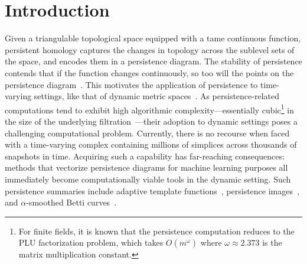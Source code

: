 \documentclass[sn-mathphys]{sn-jnl}
\begin{document}

\section{Introduction} 
Given a triangulable topological space equipped with a tame continuous function, persistent homology captures the changes in topology across the sublevel sets of the space, and encodes them in a persistence diagram. The stability of persistence contends that   if the function changes continuously, so too will the points on the persistence diagram~\cite{cohen2007stability, cohen2006vines}. 
This motivates the  application of persistence to time-varying  settings, like that of dynamic metric spaces~\cite{kim2020spatiotemporal}. 
As persistence-related computations tend to exhibit high algorithmic complexity---essentially cubic\footnote{For finite fields, it is known that the persistence computation reduces to the PLU factorization problem, which takes $O(m^\omega)$ where $\omega \approx 2.373$ is the matrix multiplication constant.} in the size of the underlying filtration~\cite{morozov2005persistence}---their adoption to dynamic settings poses a challenging computational problem.
Currently, there is no recourse when faced with a time-varying complex containing millions of simplices across thousands of snapshots in time.
Acquiring such a capability has far-reaching consequences: methods that vectorize persistence diagrams for machine learning purposes all immediately become computationally viable tools in the dynamic setting. Such persistence summaries include adaptive template functions~\cite{polanco2019adaptive}, persistence images~\cite{adams2017persistence}, and $\alpha$-smoothed Betti curves~\cite{ulmer2019topological}. 
  
\end{document}
